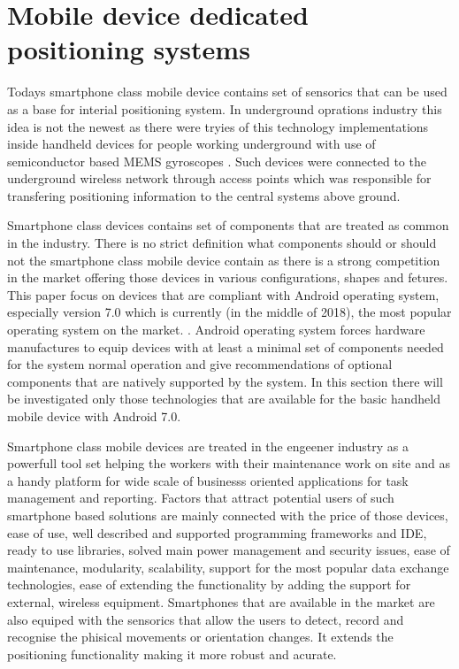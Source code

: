 \documentclass[../main.tex]{subfiles}
\begin{document}
\section{Mobile device dedicated positioning systems} %
\label{sec:mobile_device_dedicated_positioning_systems}

Todays smartphone class mobile device contains set of sensorics that can be used as a base for interial positioning system. In underground oprations industry this idea is not the newest as there were tryies of this technology implementations inside handheld devices for people working underground with use of semiconductor based MEMS gyroscopes \cite{Thesis_CM}. Such devices were connected to the underground wireless network through access points which was responsible for transfering positioning information to the central systems above ground.

Smartphone class devices contains set of components that are treated as common in the industry. There is no strict definition what components should or should not the smartphone class mobile device contain as there is a strong competition in the market offering those devices in various configurations, shapes and fetures. This paper focus on devices that are compliant with Android operating system, especially version 7.0 which is currently (in the middle of 2018), the most popular operating system on the market. \cite{android7.0_cdd}. Android operating system forces hardware manufactures to equip devices with at least a minimal set of components needed for the system normal operation and give recommendations of optional components that are natively supported by the system\cite{android7.0_cdd}. In this section there will be investigated only those technologies that are available for the basic handheld mobile device with Android 7.0.

Smartphone class mobile devices are treated in the engeener industry as a powerfull tool set helping the workers with their maintenance work on site and as a handy platform for wide scale of businesss oriented applications for task management and reporting. Factors that attract potential users of such smartphone based solutions are mainly connected with the price of those devices, ease of use, well described and supported programming frameworks and IDE, ready to use libraries, solved main power management and security issues, ease of maintenance, modularity, scalability, support for the most popular data exchange technologies, ease of extending the functionality by adding the support for external, wireless equipment. Smartphones that are available in the market are also equiped with the sensorics that allow the users to detect, record and recognise the phisical movements or orientation changes. It extends the positioning functionality making it more robust and acurate.
\end{document}

